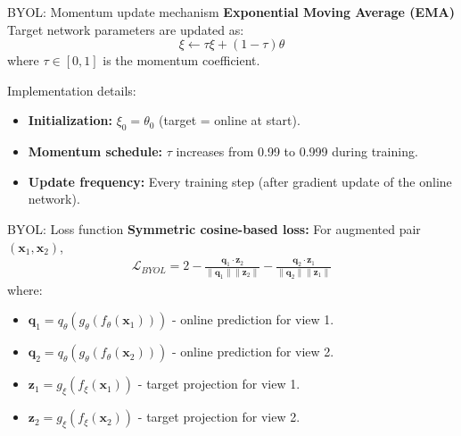 \documentclass{beamer}
\begin{document}
\begin{frame}{BYOL: Momentum update mechanism}
\textbf{Exponential Moving Average (EMA)}
Target network parameters are updated as:
$$\xi \leftarrow \tau \xi + (1 - \tau) \theta$$
where $\tau \in [0, 1]$ is the momentum coefficient.

\vspace{0.3cm}

Implementation details:
\begin{itemize}
\item \textbf{Initialization:} $\xi_0 = \theta_0$ (target = online at start).
\vspace{0.3cm}
\item \textbf{Momentum schedule:} $\tau$ increases from 0.99 to 0.999 during training.
\vspace{0.3cm}
\item \textbf{Update frequency:} Every training step (after gradient update of the online network).
\end{itemize}

\end{frame}

\begin{frame}{BYOL: Loss function}
\textbf{Symmetric cosine-based loss:}
For augmented pair $(\mathbf{x}_1, \mathbf{x}_2)$,
\begin{align*}
\mathcal{L}_{BYOL} = 2 -  \frac{\mathbf{q}_1 \cdot \mathbf{z}_2}{\|\mathbf{q}_1\| \|\mathbf{z}_2\|} -  \frac{\mathbf{q}_2 \cdot \mathbf{z}_1}{\|\mathbf{q}_2\| \|\mathbf{z}_1\|}
\end{align*}
  \vspace{0.3cm}
where:
\begin{itemize}
\item $\mathbf{q}_1 = q_\theta(g_\theta(f_\theta(\mathbf{x}_1)))$ - online prediction for view 1.
  \vspace{0.3cm}
\item $\mathbf{q}_2 = q_\theta(g_\theta(f_\theta(\mathbf{x}_2)))$ - online prediction for view 2.
  \vspace{0.3cm}
\item $\mathbf{z}_1 = g_\xi(f_\xi(\mathbf{x}_1))$ - target projection for view 1.
  \vspace{0.3cm}
\item $\mathbf{z}_2 = g_\xi(f_\xi(\mathbf{x}_2))$ - target projection for view 2.
\end{itemize}
\end{frame}
\end{document}
